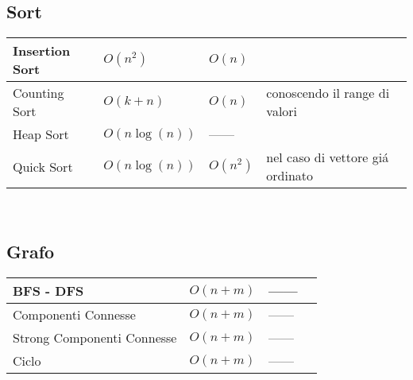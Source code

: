 \documentclass[12pt]{article}
\begin{document}
\date{}


\subsection*{Sort}
\begin{tabularx}{\textwidth}{ p{6cm} p{2.7cm} p{1.3cm} | X }
    \hline
    Insertion Sort & $O(n^2)$ & $O(n)$ &  \\ 
    \hline
	Counting Sort  & $O(k+n)$ & $O(n)$ &  {\footnotesize conoscendo il range di valori} \\ 
	\hline
	Heap Sort      & $O(n\log(n))$ &  ------ &  \\ 
	\hline
	Quick Sort     & $O(n\log(n))$ & $O(n^2)$  & {\footnotesize nel caso di vettore gi\'a ordinato} \\ 
	\hline
\end{tabularx}
\\
\subsection*{Grafo}
\begin{tabularx}{\textwidth}{ p{6cm} p{2.7cm} p{1.3cm} | X }
    \hline
    BFS - DFS                   & $O(n+m)$ & ------ &  \\ \hline
	Componenti Connesse         & $O(n+m)$ & ------ &  \\ \hline
	Strong Componenti Connesse  & $O(n+m)$ & ------ &  \\ \hline
	Ciclo                       & $O(n+m)$ & ------ &  \\ \hline
\end{tabularx}
\\
\end{document}
